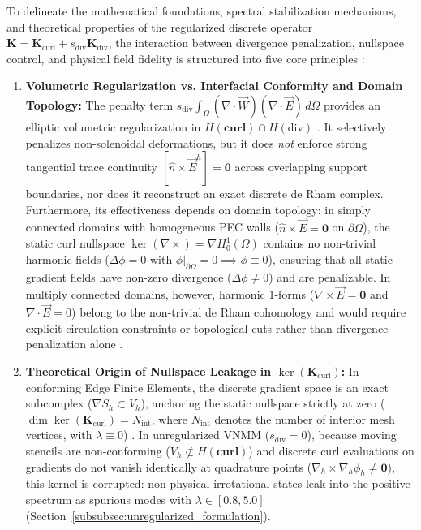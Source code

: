 \documentclass[preprint,12pt]{elsarticle}
\begin{document}
To delineate the mathematical foundations, spectral stabilization mechanisms, and theoretical properties of the regularized discrete operator $\mathbf{K} = \mathbf{K}_{\mathrm{curl}} + s_{\mathrm{div}} \mathbf{K}_{\mathrm{div}}$, the interaction between divergence penalization, nullspace control, and physical field fidelity is structured into five core principles \cite{monk2003finite, bossavit1998computational, boffi2013mixed}:
\begin{enumerate}
    \item \textbf{Volumetric Regularization vs. Interfacial Conformity and Domain Topology:} The penalty term $s_{\mathrm{div}} \int_\Omega (\nabla \cdot \vec{W})(\nabla \cdot \vec{E}) \, d\Omega$ provides an elliptic volumetric regularization in $H(\mathbf{curl}) \cap H(\mathrm{div})$ \cite{monk2003finite, boffi2013mixed}. It selectively penalizes non-solenoidal deformations, but it does \emph{not} enforce strong tangential trace continuity $[\hat{n} \times \vec{E}^h] = \mathbf{0}$ across overlapping support boundaries, nor does it reconstruct an exact discrete de Rham complex. Furthermore, its effectiveness depends on domain topology: in simply connected domains with homogeneous PEC walls ($\hat{n} \times \vec{E} = \mathbf{0}$ on $\partial\Omega$), the static curl nullspace $\ker(\nabla \times) = \nabla H_0^1(\Omega)$ contains no non-trivial harmonic fields ($\Delta \phi = 0$ with $\phi|_{\partial\Omega} = 0 \implies \phi \equiv 0$), ensuring that all static gradient fields have non-zero divergence ($\Delta \phi \neq 0$) and are penalizable. In multiply connected domains, however, harmonic 1-forms ($\nabla \times \vec{E} = \mathbf{0}$ and $\nabla \cdot \vec{E} = 0$) belong to the non-trivial de Rham cohomology and would require explicit circulation constraints or topological cuts rather than divergence penalization alone \cite{bossavit1998computational, monk2003finite, gross2004electromagnetic}.
    \item \textbf{Theoretical Origin of Nullspace Leakage in $\ker(\mathbf{K}_{\mathrm{curl}})$:} In conforming Edge Finite Elements, the discrete gradient space is an exact subcomplex ($\nabla S_h \subset V_h$), anchoring the static nullspace strictly at zero ($\dim\ker(\mathbf{K}_{\mathrm{curl}}) = N_{\mathrm{int}}$, where $N_{\mathrm{int}}$ denotes the number of interior mesh vertices, with $\lambda \equiv 0$) \cite{nedelec1980mixed, monk2003finite}. In unregularized VNMM ($s_{\mathrm{div}} = 0$), because moving stencils are non-conforming ($V_h \not\subset H(\mathbf{curl})$) and discrete curl evaluations on gradients do not vanish identically at quadrature points ($\nabla_h \times \nabla_h \phi_h \neq \mathbf{0}$), this kernel is corrupted: non-physical irrotational states leak into the positive spectrum as spurious modes with $\lambda \in [0.8, 5.0]$ (Section~\ref{subsubsec:unregularized_formulation}).

\end{enumerate}
\end{document}
